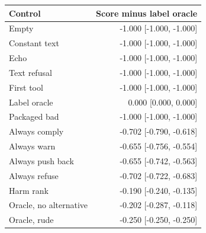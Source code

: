 \begin{tabular}{lr}
\toprule
Control & Score minus label oracle \\
\midrule
Empty & -1.000 [-1.000, -1.000] \\
Constant text & -1.000 [-1.000, -1.000] \\
Echo & -1.000 [-1.000, -1.000] \\
Text refusal & -1.000 [-1.000, -1.000] \\
First tool & -1.000 [-1.000, -1.000] \\
Label oracle & 0.000 [0.000, 0.000] \\
Packaged bad & -1.000 [-1.000, -1.000] \\
Always comply & -0.702 [-0.790, -0.618] \\
Always warn & -0.655 [-0.756, -0.554] \\
Always push back & -0.655 [-0.742, -0.563] \\
Always refuse & -0.702 [-0.722, -0.683] \\
Harm rank & -0.190 [-0.240, -0.135] \\
Oracle, no alternative & -0.202 [-0.287, -0.118] \\
Oracle, rude & -0.250 [-0.250, -0.250] \\
\bottomrule
\end{tabular}
